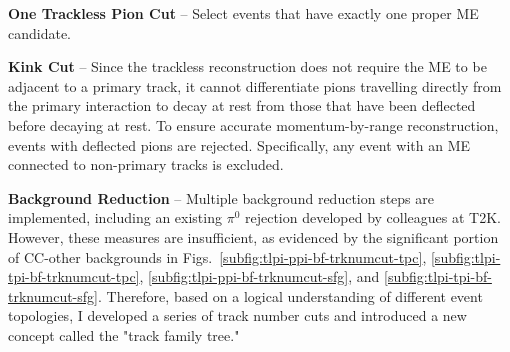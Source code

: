          \textbf{One Trackless Pion Cut} – Select events that have exactly one proper ME candidate.

          \textbf{Kink Cut} – Since the trackless reconstruction does not require the ME to be adjacent to a primary track, it cannot differentiate pions travelling directly from the primary interaction to decay at rest from those that have been deflected before decaying at rest. 
          To ensure accurate momentum-by-range reconstruction, events with deflected pions are rejected. 
          Specifically, any event with an ME connected to non-primary tracks is excluded.

          \textbf{Background Reduction} – Multiple background reduction steps are implemented, including an existing $\pi^0$ rejection developed by colleagues at T2K. 
          However, these measures are insufficient, as evidenced by the significant portion of CC-other backgrounds in Figs.~\ref{subfig:tlpi-ppi-bf-trknumcut-tpc}, \ref{subfig:tlpi-tpi-bf-trknumcut-tpc}, \ref{subfig:tlpi-ppi-bf-trknumcut-sfg}, and \ref{subfig:tlpi-tpi-bf-trknumcut-sfg}. 
          Therefore, based on a logical understanding of different event topologies, I developed a series of track number cuts and introduced a new concept called the "track family tree."

